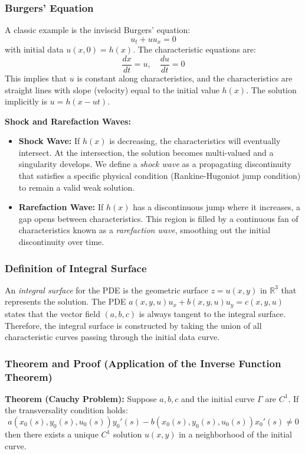 \documentclass[11pt]{article}
\theoremstyle{plain}
\theoremstyle{definition}
\theoremstyle{remark}
\begin{document}
\subsubsection{Burgers' Equation}
A classic example is the inviscid Burgers' equation:
$$ u_t + u u_x = 0 $$
with initial data $u(x,0) = h(x)$.
The characteristic equations are:
$$ \frac{dx}{dt} = u, \quad \frac{du}{dt} = 0 $$
This implies that $u$ is constant along characteristics, and the characteristics are straight lines with slope (velocity) equal to the initial value $h(x)$. The solution implicitly is $u = h(x - ut)$.

\textbf{Shock and Rarefaction Waves:}
\begin{itemize}
    \item \textbf{Shock Wave:} If $h(x)$ is decreasing, the characteristics will eventually intersect. At the intersection, the solution becomes multi-valued and a singularity develops. We define a \textit{shock wave} as a propagating discontinuity that satisfies a specific physical condition (Rankine-Hugoniot jump condition) to remain a valid weak solution.
    \item \textbf{Rarefaction Wave:} If $h(x)$ has a discontinuous jump where it increases, a gap opens between characteristics. This region is filled by a continuous fan of characteristics known as a \textit{rarefaction wave}, smoothing out the initial discontinuity over time.
\end{itemize}

\subsubsection{Definition of Integral Surface}
An \textit{integral surface} for the PDE is the geometric surface $z = u(x,y)$ in $\mathbb{R}^3$ that represents the solution. The PDE $a(x,y,u)u_x + b(x,y,u)u_y = c(x,y,u)$ states that the vector field $(a, b, c)$ is always tangent to the integral surface. Therefore, the integral surface is constructed by taking the union of all characteristic curves passing through the initial data curve.

\subsubsection{Theorem and Proof (Application of the Inverse Function Theorem)}
\textbf{Theorem (Cauchy Problem):} Suppose $a, b, c$ and the initial curve $\Gamma$ are $C^1$. If the transversality condition holds:
$$ a(x_0(s), y_0(s), u_0(s)) y_0'(s) - b(x_0(s), y_0(s), u_0(s)) x_0'(s) \neq 0 $$
then there exists a unique $C^1$ solution $u(x,y)$ in a neighborhood of the initial curve.
\end{document}
